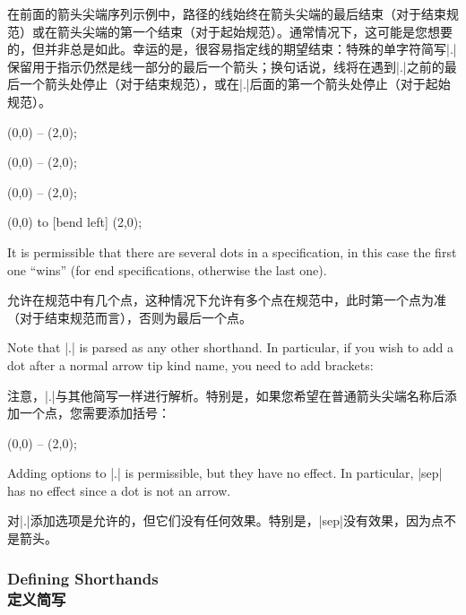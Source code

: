 在前面的箭头尖端序列示例中，路径的线始终在箭头尖端的最后结束（对于结束规范）或在箭头尖端的第一个结束（对于起始规范）。通常情况下，这可能是您想要的，但并非总是如此。幸运的是，很容易指定线的期望结束：特殊的单字符简写|.|保留用于指示仍然是线一部分的最后一个箭头；换句话说，线将在遇到|.|之前的最后一个箭头处停止（对于结束规范），或在|.|后面的第一个箭头处停止（对于起始规范）。

\begin{codeexample}[]
 \draw [<<<->>>] (0,0) -- (2,0);
\end{codeexample}
\begin{codeexample}[]
 \draw [<.<<->.>>] (0,0) -- (2,0);
\end{codeexample}
\begin{codeexample}[]
 \draw [<<.<-.>>>] (0,0) -- (2,0);
\end{codeexample}
\begin{codeexample}[]
 \draw [<<.<->.>>] (0,0) to [bend left] (2,0);
\end{codeexample}

It is permissible that there are several dots in a specification, in this case
the first one ``wins'' (for end specifications, otherwise the last one).

允许在规范中有几个点，这种情况下允许有多个点在规范中，此时第一个点为准（对于结束规范而言），否则为最后一个点。

Note that |.| is parsed as any other shorthand. In particular, if you wish to
add a dot after a normal arrow tip kind name, you need to add brackets:

注意，|.|与其他简写一样进行解析。特别是，如果您希望在普通箭头尖端名称后添加一个点，您需要添加括号：

\begin{codeexample}[preamble={\usetikzlibrary{arrows.meta}}]
  (0,0) -- (2,0);
\end{codeexample}
%
Adding options to |.| is permissible, but they have no effect. In particular,
|sep| has no effect since a dot is not an arrow.

对|.|添加选项是允许的，但它们没有任何效果。特别是，|sep|没有效果，因为点不是箭头。


\subsubsection{Defining Shorthands\\定义简写}
\label{section-arrow-tip-macro}

